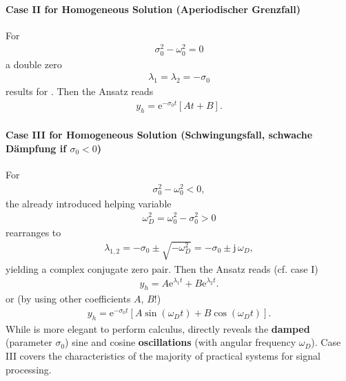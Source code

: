 \paragraph{Case II for Homogeneous Solution (Aperiodischer Grenzfall)}
For
\begin{align}
\sigma_0^2 - \omega_0^2 = 0
\end{align}
a double zero
\begin{align}
\lambda_{1} = \lambda_{2} = -\sigma_0
\end{align}
results for .
Then the Ansatz reads
\begin{align}
y_h = \mathrm{e}^{-\sigma_0 t} [A t + B].
\end{align}

\paragraph{Case III for Homogeneous Solution (Schwingungsfall,
schwache Dämpfung if $\sigma_0<0$)}
\label{pg:caseIII}
For
\begin{align}
\sigma_0^2 - \omega_0^2 < 0,
\end{align}
the already introduced helping variable
\begin{align}
\omega_D^2 = \omega_0^2 - \sigma_0^2 > 0
\end{align}
rearranges  to
\begin{align}
\label{eq:lmb12_caseIII}
\lambda_{1,2} = -\sigma_0 \pm \sqrt{-\omega_D^2}
= -\sigma_0 \pm \mathrm{j}\,\omega_D,
\end{align}
yielding a complex conjugate zero pair.
Then the Ansatz reads (cf. case I)
\begin{align}
\label{eq:Ansatz_caseIIIkomplex}
\boxed{
y_h = A \mathrm{e}^{\lambda_1 t} + B \mathrm{e}^{\lambda_2 t}.
}
\end{align}
or (by using other coefficients $A$, $B$!)
\begin{align}
\label{eq:Ansatz_caseIIIsincos}
y_h = \mathrm{e}^{-\sigma_0 t}
\left[ A \sin(\omega_D t) + B \cos(\omega_D t)\right].
\end{align}
While  is more elegant to perform calculus,
 directly reveals the \textbf{damped}
(parameter $\sigma_0$) sine and cosine \textbf{oscillations}
(with angular frequency $\omega_D$).
%
Case III covers the characteristics of the majority of practical systems
for signal processing.



